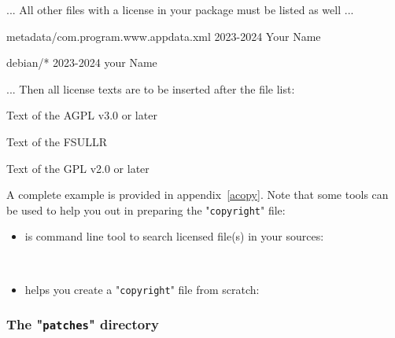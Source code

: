 \noindent ... All other files with a license in your package must be listed as well ...
{\footnotesize{
\begin{script}
      metadata/com.program.www.appdata.xml
 2023-2024 Your Name
   

      debian/*
 2023-2024 your Name
   
\end{script}
}}
\noindent ... Then all license texts are to be inserted after the file list: 
{\footnotesize{
\begin{script}
 
 Text of the AGPL v3.0 or later

 
 Text of the FSULLR

 
 Text of the GPL v2.0 or later
\end{script}
}}
A complete example is provided in appendix~\ref{acopy}. 
\newpage
\noindent Note that some tools can be used to help you out in preparing the "\texttt{copyright}" file:
\begin{itemize}
\item {} is command line tool to search licensed file(s) in your sources:
{\footnotesize{
\begin{scripti}
   
\end{scripti}
}}
\\[-1.5cm]
\item {} helps you create a "\texttt{copyright}" file from scratch:
{\footnotesize{
\begin{scripti}
 
\end{scripti}
}}
\end{itemize}

\subsubsection{The "\texttt{patches}" directory}

